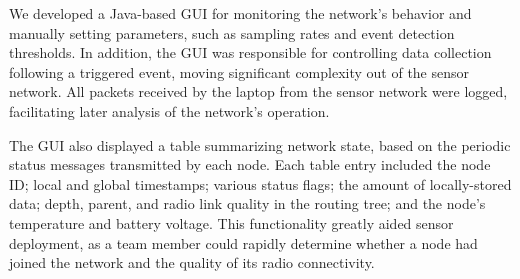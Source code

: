 We developed a Java-based GUI for monitoring the network's behavior and
manually setting parameters, such as sampling rates and event detection
thresholds. In addition, the GUI was responsible for controlling data
collection following a triggered event, moving significant complexity out of
the sensor network. All packets received by the laptop from the sensor
network were logged, facilitating later analysis of the network's operation.

The GUI also displayed a table summarizing network state, based on the
periodic status messages transmitted by each node. Each table entry included
the node ID; local and global timestamps; various status flags; the amount of
locally-stored data; depth, parent, and radio link quality in the routing
tree; and the node's temperature and battery voltage. This functionality
greatly aided sensor deployment, as a team member could rapidly determine
whether a node had joined the network and the quality of its radio
connectivity.
